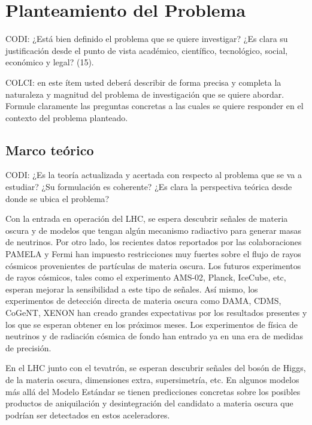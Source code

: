 \section{ Planteamiento del Problema }
\begin{instrucciones}
  CODI: ¿Está bien definido el problema que se quiere investigar? ¿Es clara su justificación desde el punto de vista académico, científico, tecnológico, social, económico y legal? (15).

  COLCI: en este ítem usted deberá describir de forma precisa y completa la
  naturaleza y magnitud del problema de investigación que se quiere
  abordar. Formule claramente las preguntas concretas a las cuales se
  quiere responder en el contexto del problema planteado.
\end{instrucciones}



\subsection{Marco teórico}
\begin{instrucciones}
 CODI: ¿Es la teoría actualizada y acertada con respecto al problema que se va a estudiar? ¿Su formulación es coherente? ¿Es clara la perspectiva teórica desde donde se ubica el problema?
\end{instrucciones}

Con la entrada en operación del LHC, se espera descubrir señales de materia oscura y de modelos que tengan algún mecanismo radiactivo para generar masas de neutrinos.
Por otro lado, los recientes datos reportados por las colaboraciones PAMELA y Fermi han impuesto restricciones muy fuertes sobre el flujo de rayos cósmicos provenientes de partículas de materia oscura. Los futuros experimentos de rayos cósmicos, tales como el experimento AMS-02, Planck, IceCube, etc, esperan mejorar la sensibilidad a este tipo de señales. Así mismo, los experimentos de detección directa de materia oscura como DAMA, CDMS, CoGeNT, XENON han creado grandes expectativas por los resultados presentes y los que se esperan obtener en los próximos meses. Los experimentos de física de neutrinos y de radiación cósmica de fondo han entrado ya en una era de medidas de precisión.

En el LHC junto con el tevatrón, se esperan descubrir señales del bosón de Higgs, de la materia oscura, dimensiones extra, supersimetría, etc. En algunos modelos más allá del Modelo Estándar se tienen predicciones concretas sobre los posibles productos de aniquilación y desintegración del candidato a materia oscura que podrían ser detectados en estos aceleradores.


